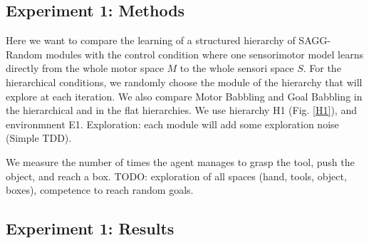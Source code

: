 \documentclass[conference]{include/IEEEtran}
\begin{document}
	
	\subsection{Experiment 1: Methods}		
				
		Here we want to compare the learning of a structured hierarchy of SAGG-Random modules with the control condition where one sensorimotor model learns
		directly from the whole motor space $M$ to the whole sensori space $S$. 
		For the hierarchical conditions, we randomly choose the module of the hierarchy that will explore at each iteration.
		We also compare Motor Babbling and Goal Babbling in the hierarchical and in the flat hierarchies.
		We use hierarchy H1 (Fig. \ref{H1}), and environmnent E1.
		Exploration: each module will add some exploration noise (Simple TDD).
			
		We measure the number of times the agent manages to grasp the tool, push the object, and reach a box.
		TODO: exploration of all spaces (hand, tools, object, boxes), competence to reach random goals.
		
			
	\subsection{Experiment 1: Results}
	
\end{document}
